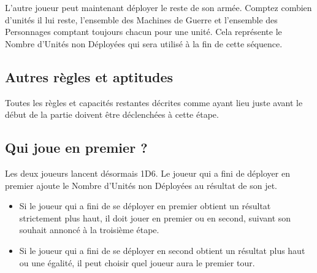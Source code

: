 L'autre joueur peut maintenant déployer le reste de son armée. Comptez combien d'unités il lui reste, l'ensemble des Machines de Guerre et l'ensemble des Personnages comptant toujours chacun pour une unité. Cela représente le \og Nombre d'Unités non Déployées \fg{} qui sera utilisé à la fin de cette séquence.

\subsection{Autres règles et aptitudes}

Toutes les règles et capacités restantes décrites comme ayant lieu juste avant le début de la partie doivent être déclenchées à cette étape.

\newpage
\hypertarget{rollforfirstturn}{\subsection{Qui joue en premier ?}}

Les deux joueurs lancent désormais 1D6. Le joueur qui a fini de déployer en premier ajoute le \og Nombre d'Unités non Déployées \fg{} au résultat de son jet.
\begin{itemize}[label={-}]
\item Si le joueur qui a fini de se déployer en premier obtient un résultat strictement plus haut, il doit jouer en premier ou en second, suivant son souhait annoncé à la troisième étape.
\item Si le joueur qui a fini de se déployer en second obtient un résultat plus haut ou une égalité, il peut choisir quel joueur aura le premier tour.
\end{itemize}

